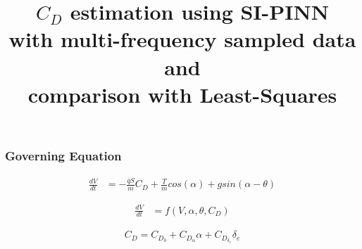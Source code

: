 \documentclass{beamer}
\title{\(C_D\) estimation using SI-PINN \\ with multi-frequency sampled data \\ and \\ comparison with Least-Squares}
\begin{document}
\begin{frame}
	\maketitle
\end{frame}

\begin{frame}
	\frametitle{Governing Equation}

	\begin{align*}
		\frac{dV}{dt} &= -\frac{\bar{q}S}{m}C_D + \frac{T}{m}cos(\alpha) + g sin(\alpha - \theta)
	\end{align*}

	\vspace{0.5cm}

	\begin{align*}
		\frac{dV}{dt} &= f\left(V, \alpha, \theta, C_D\right)
	\end{align*}

	\vspace{0.5cm}

	\begin{align*}
		C_D = C_{D_0} + C_{D_{\alpha}} \alpha + C_{D_{\delta_e}} \delta_e
	\end{align*}

\end{frame}


\end{document}
